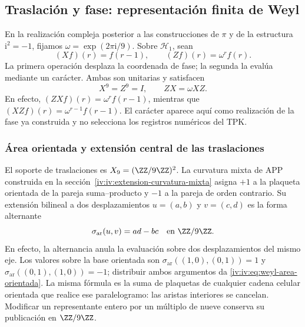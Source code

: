 \subsection{Traslación y fase: representación finita de Weyl}

En la realización compleja posterior a las construcciones de
\(\pi\) y de la estructura \(\mathrm i^2=-1\), fijamos
\(\omega=\exp(2\pi\mathrm i/9)\). Sobre \(\mathcal H_1\), sean
\begin{equation}
 (Xf)(r)=f(r-1),\qquad (Zf)(r)=\omega^r f(r).
 \label{iv:iv:eq:weyl-operadores}
\end{equation}
La primera operación desplaza la coordenada de fase; la segunda la
evalúa mediante un carácter. Ambas son unitarias y satisfacen
\begin{equation}
 X^9=Z^9=I,\qquad ZX=\omega XZ.
 \label{iv:iv:eq:weyl-relacion}
\end{equation}
En efecto, \((ZXf)(r)=\omega^r f(r-1)\), mientras que
\((XZf)(r)=\omega^{r-1}f(r-1)\). El carácter aparece aquí como
realización de la fase ya construida y no selecciona los registros
numéricos del TPK.

\subsubsection{Área orientada y extensión central de las traslaciones}
\label{iv:iv:weyl-area-extension}

El soporte de traslaciones es \(X_9=(\ZZ/9\ZZ)^2\).
La curvatura mixta de APP construida en la
sección~\ref{iv:iv:extension-curvatura-mixta} asigna \(+1\) a la
plaqueta orientada de la pareja suma--producto y \(-1\) a la
pareja de orden contrario. Su extensión bilineal a dos desplazamientos
\(u=(a,b)\) y \(v=(c,d)\) es la forma alternante
\begin{equation}
 \sigma_{\mathrm{ar}}(u,v)=ad-bc\quad\text{en }\ZZ/9\ZZ.
 \label{iv:iv:eq:weyl-area-orientada}
\end{equation}
En efecto, la alternancia anula la evaluación sobre dos desplazamientos
del mismo eje. Los valores sobre la base orientada son
\(\sigma_{\mathrm{ar}}((1,0),(0,1))=1\) y
\(\sigma_{\mathrm{ar}}((0,1),(1,0))=-1\); distribuir ambos
argumentos da \eqref{iv:iv:eq:weyl-area-orientada}. La misma fórmula es
la suma de plaquetas de cualquier cadena celular orientada que realice
ese paralelogramo: las aristas interiores se cancelan. Modificar un
representante entero por un múltiplo de nueve conserva su publicación
en \(\ZZ/9\ZZ\).

